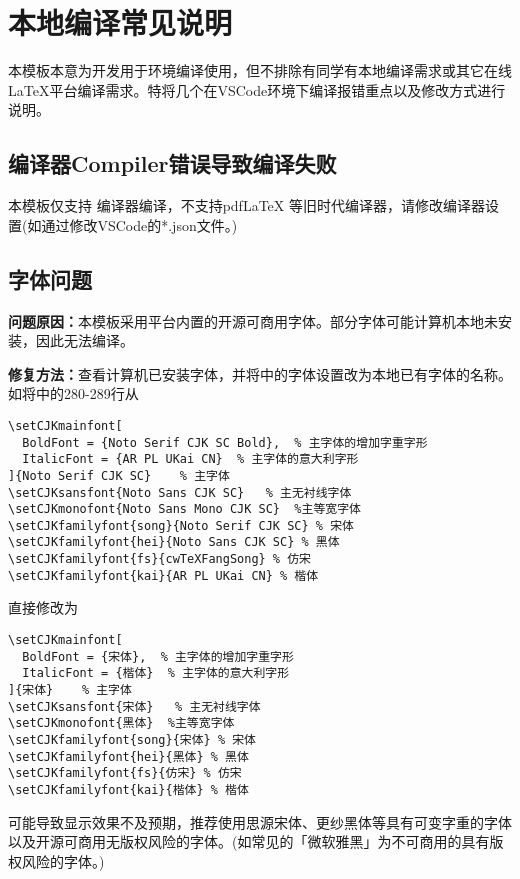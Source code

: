 \chapter{本地编译常见说明}

本模板本意为开发用于\overleaf 环境编译使用，但不排除有同学有本地编译需求或其它在线\LaTeX{}平台编译需求。特将几个在VSCode环境下编译报错重点以及修改方式进行说明。

\section{编译器Compiler错误导致编译失败}
本模板仅支持\XeTeX{} 编译器编译，不支持pdf\LaTeX{} 等旧时代编译器，请修改编译器设置(如通过修改VSCode的*.json文件。)

\section{字体问题}

\textbf{问题原因：}本模板采用\overleaf 平台内置的开源可商用字体。部分字体可能计算机本地未安装，因此无法编译。

\textbf{修复方法：}查看计算机已安装字体，并将中的字体设置改为本地已有字体的名称。如将中的280-289行从

\begin{lstlisting}[language={[LaTeX]TeX}]
    \setCJKmainfont[
  BoldFont = {Noto Serif CJK SC Bold},  % 主字体的增加字重字形
  ItalicFont = {AR PL UKai CN}  % 主字体的意大利字形
]{Noto Serif CJK SC}    % 主字体
\setCJKsansfont{Noto Sans CJK SC}   % 主无衬线字体
\setCJKmonofont{Noto Sans Mono CJK SC}  %主等宽字体
\setCJKfamilyfont{song}{Noto Serif CJK SC} % 宋体
\setCJKfamilyfont{hei}{Noto Sans CJK SC} % 黑体
\setCJKfamilyfont{fs}{cwTeXFangSong} % 仿宋
\setCJKfamilyfont{kai}{AR PL UKai CN} % 楷体
\end{lstlisting}

\noindent 直接修改为
\begin{lstlisting}[language={[LaTeX]TeX}]
    \setCJKmainfont[
  BoldFont = {宋体},  % 主字体的增加字重字形
  ItalicFont = {楷体}  % 主字体的意大利字形
]{宋体}    % 主字体
\setCJKsansfont{宋体}   % 主无衬线字体
\setCJKmonofont{黑体}  %主等宽字体
\setCJKfamilyfont{song}{宋体} % 宋体
\setCJKfamilyfont{hei}{黑体} % 黑体
\setCJKfamilyfont{fs}{仿宋} % 仿宋
\setCJKfamilyfont{kai}{楷体} % 楷体
\end{lstlisting}

可能导致显示效果不及预期，推荐使用思源宋体、更纱黑体等具有可变字重的字体以及开源可商用无版权风险的字体。(如常见的「微软雅黑」为不可商用的具有版权风险的字体。)

